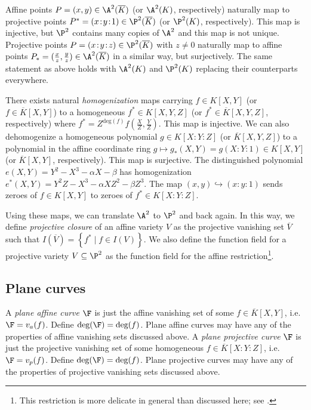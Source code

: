 \documentclass[11pt,letterpaper]{article}
\newcommand{\polys}{K[X,Y]}
\newcommand{\hpolys}{K[X\!:\!Y\!:\!Z]}
\theoremstyle{definition}
\newcommand{\6}{\mathbf}
\newcommand{\7}{\mathcal}
\begin{document}
Affine points $P=(x,y) \in \A^2(\overline{K})$ (or $\A^2(K)$, respectively) naturally map to projective points $P^*=(x\!:\!y\!:\!1) \in \P^2(\overline{K})$ (or $\P^2(K)$, respectively). This map is injective, but $\P^2$ contains many copies of $\A^2$ and this map is not unique. Projective points $P=(x\!:\!y\!:\!z) \in \P^2(\overline{K})$ with $z \neq 0$ naturally map to affine points $P_*=(\frac{x}{z}, \frac{y}{z}) \in \A^2(\overline{K})$ in a similar way, but surjectively. The same statement as above holds with $\A^2(K)$ and $\P^2(K)$ replacing their counterparts everywhere.

There exists natural \textit{homogenization} maps carrying $f \in \polys$ (or $f \in \overline{K}[X,Y]$) to a homogeneous $f^* \in K[X,Y,Z]$ (or $f^* \in \overline{K}[X,Y,Z]$, respectively) where $f^* = Z^{\text{deg}(f)}f(\frac{X}{Z}, \frac{Y}{Z})$. This map is injective.
We can also dehomogenize a homogeneous polynomial $g \in \hpolys$ (or $\overline{K}[X,Y,Z]$) to a polynomial in the affine coordinate ring $g \mapsto g_*(X,Y) = g(X\!:\!Y\!:\!1) \in \polys$ (or $\overline{K}[X,Y]$, respectively). This map is surjective.
The distinguished polynomial $e(X,Y) = Y^2 - X^3 - \alpha X - \beta$ has homogenization $e^*(X,Y) = Y^2Z - X^3 - \alpha XZ^2 - \beta Z^3$. The map $(x,y) \hookrightarrow (x\!:\!y\!:\!1)$ sends zeroes of $f \in K[X,Y]$ to zeroes of $f^* \in K[X\!:\!Y\!:\!Z]$.

Using these maps, we can translate $\A^2$ to $\P^2$ and back again.  In this way, we define \textit{projective closure} of an affine variety $V$ as the projective vanishing set $\overline{V}$ such that $I(\overline{V}) = \left\{f^* \mid f \in I(V)\right\}$. We also define the function field for a projective variety $V \subseteq \P^2$ as the function field for the affine restriction\footnote{This restriction is more delicate in general than discussed here; see \cite{Silverman}.}.


\subsection{Plane curves}
\label{sec:planecurve}

A \textit{plane affine curve} $\F$ is just the affine vanishing set of some $f \in \overline{K}[X,Y]$, i.e.\ $\F = v_a(f)$. Define $\text{deg}(\F) = \text{deg}(f)$. Plane affine curves may have any of the properties of affine vanishing sets discussed above. 
A \textit{plane projective curve} $\F$ is just the projective vanishing set of some homogeneous $f \in \overline{K}[X\!:\!Y\!:\!Z]$, i.e.\ $\F = v_p(f)$. Define $\text{deg}(\F) = \text{deg}(f)$. Plane projective curves may have any of the properties of projective vanishing sets discussed above. 
\end{document}
